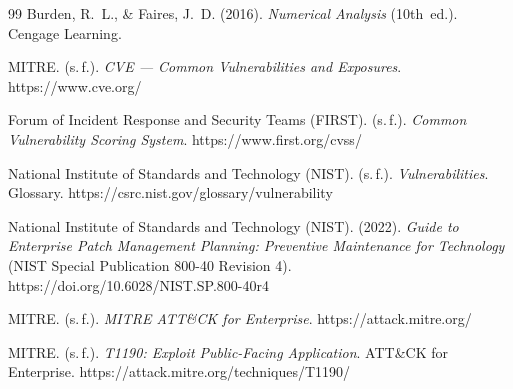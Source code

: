 \documentclass[11pt,a4paper]{article}
\begin{document}
\begin{thebibliography}{99}
Burden, R.~L., \& Faires, J.~D. (2016).
\emph{Numerical Analysis} (10th~ed.). Cengage Learning.

MITRE. (s.\,f.).
\emph{CVE --- Common Vulnerabilities and Exposures}.
https://www.cve.org/

Forum of Incident Response and Security Teams (FIRST). (s.\,f.).
\emph{Common Vulnerability Scoring System}.
https://www.first.org/cvss/

National Institute of Standards and Technology (NIST). (s.\,f.).
\emph{Vulnerabilities}.
Glossary. https://csrc.nist.gov/glossary/vulnerability

National Institute of Standards and Technology (NIST). (2022).
\emph{Guide to Enterprise Patch Management Planning: Preventive Maintenance
for Technology} (NIST Special Publication 800-40 Revision 4).
https://doi.org/10.6028/NIST.SP.800-40r4

MITRE. (s.\,f.).
\emph{MITRE ATT\&CK for Enterprise}.
https://attack.mitre.org/

MITRE. (s.\,f.).
\emph{T1190: Exploit Public-Facing Application}.
ATT\&CK for Enterprise.
https://attack.mitre.org/techniques/T1190/
\end{thebibliography}
\end{document}
